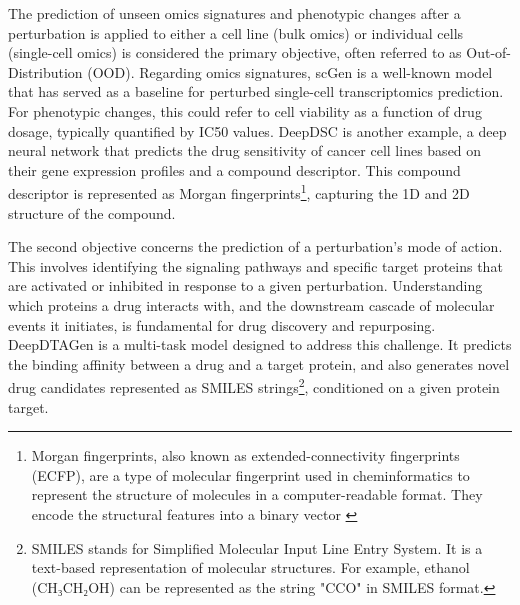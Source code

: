 \documentclass[12pt, a4paper]{article}
\begin{document}
The prediction of unseen omics signatures and phenotypic changes after a perturbation is applied to either a cell line (bulk omics) or individual cells (single-cell omics) is considered the primary objective, often referred to as Out-of-Distribution (OOD). Regarding omics signatures, scGen is a well-known model that has served as a baseline for perturbed single-cell transcriptomics prediction. For phenotypic changes, this could refer to cell viability as a function of drug dosage, typically quantified by IC50 values. DeepDSC \cite{li2019deepdsc} is another example, a deep neural network that predicts the drug sensitivity of cancer cell lines based on their gene expression profiles and a compound descriptor. This compound descriptor is represented as Morgan fingerprints\footnote{Morgan fingerprints, also known as extended-connectivity fingerprints (ECFP), are a type of molecular fingerprint used in cheminformatics to represent the structure of molecules in a computer-readable format. They encode the structural features into a binary vector \cite{morgan1965generation}}, capturing the 1D and 2D structure of the compound.



The second objective concerns the prediction of a perturbation's mode of action. This involves identifying the signaling pathways and specific target proteins that are activated or inhibited in response to a given perturbation. Understanding which proteins a drug interacts with, and the downstream cascade of molecular events it initiates, is fundamental for drug discovery and repurposing.
DeepDTAGen \cite{shah2025deepdtagen} is a multi-task model designed to address this challenge. It predicts the binding affinity between a drug and a target protein, and also generates novel drug candidates represented as SMILES strings\footnote{SMILES stands for Simplified Molecular Input Line Entry System. It is a text-based representation of molecular structures. For example, ethanol (CH₃CH₂OH) can be represented as the string "CCO" in SMILES format.}, conditioned on a given protein target.
\end{document}
